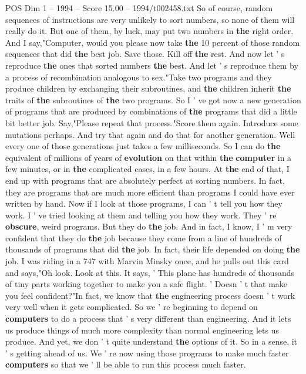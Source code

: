 \begin{textsample}{POS Dim 1 – 1994 – Score 15.00 – 1994/t002458.txt}
So of course, random sequences of instructions are very unlikely to sort numbers, so none of them will really do it.
But one of them, by luck, may put two numbers in \textbf{the} right order.
And I say,"Computer, would you please now take \textbf{the} 10 percent of those random sequences that did \textbf{the} best job.
Save those.
Kill off \textbf{the} rest.
And now let ' s reproduce \textbf{the} ones that sorted numbers \textbf{the} best.
And let ' s reproduce them by a process of recombination analogous to sex."Take two programs and they produce children by exchanging their subroutines, and \textbf{the} children inherit \textbf{the} traits of \textbf{the} subroutines of \textbf{the} two programs.
So I ' ve got now a new generation of programs that are produced by combinations of \textbf{the} programs that did a little bit better job.
Say,"Please repeat that process."Score them again.
Introduce some mutations perhaps.
And try that again and do that for another generation.
Well every one of those generations just takes a few milliseconds.
So I can do \textbf{the} equivalent of millions of years of \textbf{evolution} on that within \textbf{the} \textbf{computer} in a few minutes, or in \textbf{the} complicated cases, in a few hours.
At \textbf{the} end of that, I end up with programs that are absolutely perfect at sorting numbers.
In fact, they are programs that are much more efficient than programs I could have ever written by hand.
Now if I look at those programs, I can ' t tell you how they work.
I ' ve tried looking at them and telling you how they work.
They ' re \textbf{obscure}, weird programs.
But they do \textbf{the} job.
And in fact, I know, I ' m very confident that they do \textbf{the} job because they come from a line of hundreds of thousands of programs that did \textbf{the} job.
In fact, their life depended on doing \textbf{the} job.
I was riding in a 747 with Marvin Minsky once, and he pulls out this card and says,"Oh look.
Look at this.
It says, ' This plane has hundreds of thousands of tiny parts working together to make you a safe flight. ' Doesn ' t that make you feel confident?"In fact, we know that \textbf{the} engineering process doesn ' t work very well when it gets complicated.
So we ' re beginning to depend on \textbf{computers} to do a process that ' s very different than engineering.
And it lets us produce things of much more complexity than normal engineering lets us produce.
And yet, we don ' t quite understand \textbf{the} options of it.
So in a sense, it ' s getting ahead of us.
We ' re now using those programs to make much faster \textbf{computers} so that we ' ll be able to run this process much faster.

\end{textsample}
